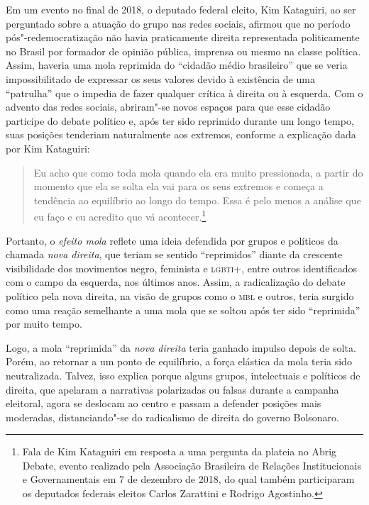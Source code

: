 Em um evento no final de 2018, o deputado federal eleito, Kim Kataguiri,
ao ser perguntado sobre a atuação do grupo nas redes sociais, afirmou
que no período pós"-redemocratização não havia praticamente direita
representada politicamente no Brasil por formador de opinião pública,
imprensa ou mesmo na classe política. Assim, haveria uma mola reprimida
do ``cidadão médio brasileiro'' que se veria impossibilitado de
expressar os seus valores devido à existência de uma ``patrulha'' que o
impedia de fazer qualquer crítica à direita ou à esquerda. Com o advento
das redes sociais, abriram"-se novos espaços para que esse cidadão
participe do debate político e, após ter sido reprimido durante um longo
tempo, suas posições tenderiam naturalmente aos extremos, conforme a
explicação dada por Kim Kataguiri:

\begin{quote}
Eu acho que como toda mola quando ela era muito pressionada, a
partir do momento que ela se solta ela vai para os seus extremos e
começa a tendência ao equilíbrio ao longo do tempo. Essa é pelo menos a
análise que eu faço e eu acredito que vá acontecer.\footnote{Fala de Kim Kataguiri em resposta a uma
  pergunta da plateia no Abrig Debate, evento realizado pela Associação
  Brasileira de Relações Institucionais e Governamentais em 7 de
  dezembro de 2018, do qual também participaram os deputados federais
  eleitos Carlos Zarattini e Rodrigo Agostinho.}
\end{quote}

Portanto, o \textit{efeito mola} reflete uma ideia defendida por grupos e
políticos da chamada \textit{nova direita}, que teriam se sentido
``reprimidos'' diante da crescente visibilidade dos movimentos negro,
feminista e \textsc{lgbti}+, entre outros identificados com o campo da esquerda,
nos últimos anos. Assim, a radicalização do debate político pela nova
direita, na visão de grupos como o \textsc{mbl} e outros, teria surgido como uma
reação semelhante a uma mola que se soltou após ter sido ``reprimida''
por muito tempo.

Logo, a mola ``reprimida'' da \textit{nova direita} teria ganhado impulso depois
de solta. Porém, ao retornar a um ponto de equilíbrio, a força elástica
da mola teria sido neutralizada. Talvez, isso explica porque alguns
grupos, intelectuais e políticos de direita, que apelaram a narrativas
polarizadas ou falsas durante a campanha eleitoral, agora se deslocam ao
centro e passam a defender posições mais moderadas, distanciando"-se do
radicalismo de direita do governo Bolsonaro.

